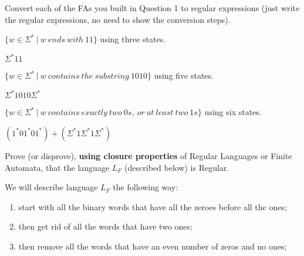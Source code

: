 \documentclass[12pt]{article}
\newenvironment{exercise}[2][Exercise]{\begin{trivlist}
\item[\hskip \labelsep {\bfseries #1}\hskip \labelsep {\bfseries #2.}]}{\end{trivlist}}
\newenvironment{solution}[1][{\color{red} Solution:}]{\begin{trivlist}
\item[\hskip \labelsep {\bfseries #1}\hskip \labelsep {\bfseries}]}{\end{trivlist}}
\begin{document}
\newpage


\begin{exercise}{2}
Convert each of the FAs you built in Question 1 to regular expressions (just write the regular expressions, no need to show the conversion steps).
\end{exercise}

\begin{enumerate}[(a)]
	\item $\{ w \in \Sigma^* \ | \ w \ ends \ with \ 11 \}$ using three states.
	\begin{solution}
	$\Sigma ^* 1 1$
 
	\end{solution}
	\item $\{ w \in \Sigma^* \ | \ w \ contains \ the \ substring \ 1010  \}$ using five states.
	\begin{solution}
        $\Sigma ^* 1 0 1 0 \Sigma ^*$
	\end{solution}
	
	\item$\{ w \in \Sigma^* \ | \ w \ contains \ exactly \ two \ 0s, \ or \ at \ least \ two \ 1s \}$ using six states.
	\begin{solution}
        $(1^* 0 1^* 0 1^*) + (\Sigma ^* 1 \Sigma ^* 1  \Sigma ^*)$
	\end{solution}
	
\end{enumerate}

\clearpage

\begin{exercise}{3}

Prove (or disprove), \textbf{using closure properties} of Regular Languages or Finite Automata, that the language $L_F$ (described below) is Regular.

We will describe language $L_F$ the following way: 

\begin{enumerate}
    \item start with all the binary words that have all the zeroes before all the ones;
    \item then get rid of all the words that have two ones;
    \item then remove all the words that have an even number of zeros and no ones;
\end{enumerate}

\end{exercise}
\end{document}
